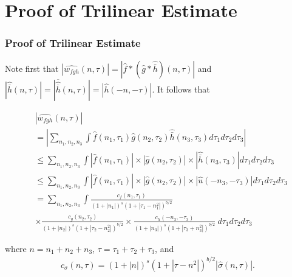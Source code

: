 \documentclass[handout]{beamer}
\numberwithin{equation}{section}
\newcommand{\wh}{\widehat}
\begin{document}
\section{Proof of Trilinear Estimate}

\begin{frame}
	\frametitle{Proof of Trilinear Estimate}

	 Note first that $|\wh{w_{fgh}}(n, \tau) |  = | \wh{f} * ( \wh{g} 
* \wh{\bar h})(n, \tau)|$ and $| \wh{\bar{h}}(n, \tau) | = |\overline{ \wh{\overline{h}} 
}(n, \tau)| = | \wh{h}(-n, -\tau) |$. It follows that

\end{frame}

%
%
%
\begin{frame}


\begin{equation}
	\label{non-lin-rep}
	\begin{split}
		& | \wh{w_{fgh}}(n, \tau)|
		\\
		& = | \sum_{n_1, n_2, n_3}  \int \wh{f}\left( n_1,  \tau_1 
\right) \wh{g}\left( n_2, \tau_2  
\right) \wh{\bar h}\left( n_3, \tau_3 \right) d \tau_1 d \tau_2 d \tau_3 |
\\
& \le \sum_{n_1,n_2,n_3}  \int | \wh{f}\left( n_1, \tau_1 
\right) | \times  | \wh{g}\left( n_2, \tau_2 
\right) | \times | \wh{\bar h}\left( n_3, \tau_3 \right) | d \tau_1 d \tau_2 d 
\tau_3
\\
& \le \sum_{n_1,n_2,n_3}  \int | \wh{f}\left( n_1, \tau_1 
\right) | \times | \wh{g}\left( n_2, \tau_2 
\right) | \times | \wh{u}\left( -n_3, - \tau_3 \right) | d \tau_1 d \tau_2 d 
\tau_3
\\
& = \sum_{n_1,n_2,n_3} \int \frac{c_f\left( n_1, \tau_1 
\right)}{\left(1 + |n_1| \right)^s \left( 1 + | \tau_1 - n_1^{2} | \right)^{b/2}}
\\
& \times \frac{c_{g}\left( n_2, \tau_2 \right)}{\left(1 + |n_2|\right) 
^s\left( 1 + | \tau_2 -  n_2^{2 }| 
\right)^{b/2}}
 \times \frac{c_{h}\left( -n_3, -\tau_3 \right)}{\left(1 + |n_3|\right) ^s\left( 1 + | 
\tau_3 + n_3^{2 } | \right)^{b/2}} \ d \tau_1 d \tau_2 d \tau_3
\end{split}
\end{equation}


%
%
where $n = n_1 + n_2 + n_3$, $\tau = \tau_1 + \tau_2 + \tau_3$, and 
%
%
\begin{equation*}
	\begin{split}
		c_\sigma(n, \tau) = \left(1 + |n| \right) ^s \left( 1 + | \tau - n^{2 } |  
		\right)^{b/2} | \wh{\sigma}\left( n, \tau \right) | .
	\end{split}
\end{equation*}

\end{frame}
\end{document}
